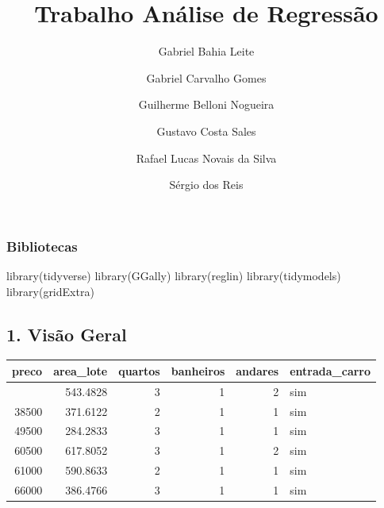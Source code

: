 \documentclass[
  letterpaper,
  DIV=11,
  numbers=noendperiod]{scrartcl}
\title{Trabalho Análise de Regressão}
\author{Gabriel Bahia Leite \and Gabriel Carvalho Gomes \and Guilherme
Belloni Nogueira \and Gustavo Costa Sales \and Rafael Lucas Novais da
Silva \and Sérgio dos Reis}
\date{}
\newenvironment{Shaded}{\begin{snugshade}}{\end{snugshade}}
\newcommand{\FunctionTok}[1]{\textcolor[rgb]{0.28,0.35,0.67}{#1}}
\newcommand{\NormalTok}[1]{\textcolor[rgb]{0.00,0.23,0.31}{#1}}
\newcounter{none} %
\begin{document}
\maketitle


\subsubsection{Bibliotecas}\label{bibliotecas}

\begin{Shaded}
\begin{Highlighting}[]
\FunctionTok{library}\NormalTok{(tidyverse)}
\FunctionTok{library}\NormalTok{(GGally)}
\FunctionTok{library}\NormalTok{(reglin)}
\FunctionTok{library}\NormalTok{(tidymodels)}
\FunctionTok{library}\NormalTok{(gridExtra)}
\end{Highlighting}
\end{Shaded}

\subsection{1. Visão Geral}\label{visuxe3o-geral}

{\def\LTcaptype{none} %
\begin{longtable}[]{@{}rrrrrl@{}}
\toprule\noalign{}
preco & area\_lote & quartos & banheiros & andares & entrada\_carro \\
\midrule\noalign{}
\endhead
\bottomrule\noalign{}
\endlastfoot
42000 & 543.4828 & 3 & 1 & 2 & sim \\
38500 & 371.6122 & 2 & 1 & 1 & sim \\
49500 & 284.2833 & 3 & 1 & 1 & sim \\
60500 & 617.8052 & 3 & 1 & 2 & sim \\
61000 & 590.8633 & 2 & 1 & 1 & sim \\
66000 & 386.4766 & 3 & 1 & 1 & sim \\
\end{longtable}
}
\end{document}
